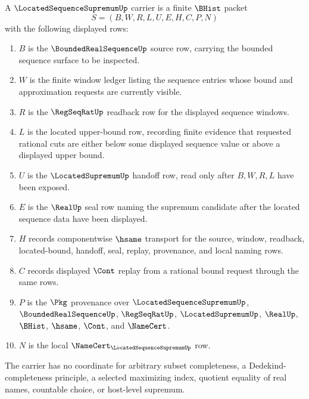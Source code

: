 \begin{definition}
\label{def:located-sequence-supremum-carrier}
A $\LocatedSequenceSupremumUp$ carrier is a finite $\BHist$ packet
$$
S=(B,W,R,L,U,E,H,C,P,N)
$$
with the following displayed rows:
\begin{enumerate}
\item $B$ is the $\BoundedRealSequenceUp$ source row, carrying the bounded sequence surface to be inspected.
\item $W$ is the finite window ledger listing the sequence entries whose bound and approximation requests are currently visible.
\item $R$ is the $\RegSeqRatUp$ readback row for the displayed sequence windows.
\item $L$ is the located upper-bound row, recording finite evidence that requested rational cuts are either below some displayed sequence value or above a displayed upper bound.
\item $U$ is the $\LocatedSupremumUp$ handoff row, read only after $B,W,R,L$ have been exposed.
\item $E$ is the $\RealUp$ seal row naming the supremum candidate after the located sequence data have been displayed.
\item $H$ records componentwise $\hsame$ transport for the source, window, readback, located-bound, handoff, seal, replay, provenance, and local naming rows.
\item $C$ records displayed $\Cont$ replay from a rational bound request through the same rows.
\item $P$ is the $\Pkg$ provenance over $\LocatedSequenceSupremumUp$, $\BoundedRealSequenceUp$, $\RegSeqRatUp$, $\LocatedSupremumUp$, $\RealUp$, $\BHist$, $\hsame$, $\Cont$, and $\NameCert$.
\item $N$ is the local $\NameCert_{\LocatedSequenceSupremumUp}$ row.
\end{enumerate}
The carrier has no coordinate for arbitrary subset completeness, a Dedekind-completeness principle, a selected maximizing index, quotient equality of real names, countable choice, or host-level supremum.
\end{definition}

